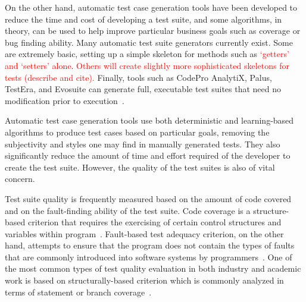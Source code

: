On the other hand, automatic test case generation tools have been developed to reduce the time and cost of developing a test suite, and some algorithms, in theory, can be used to help improve particular business goals such as coverage or bug finding ability.  Many automatic test suite generators currently exist.  Some are extremely basic, setting up a simple skeleton for methods such as \textcolor{red}{`getters' and `setters' alone}\cite{}.  \textcolor{red}{Others will create slightly more sophisticated skeletons for tests (describe and cite).}  Finally, tools such as CodePro AnalytiX, Palus, TestEra, and Evosuite can generate full, executable test suites that need no modification prior to execution~\cite{fraser:2011:eat:2025113.2025179, Zhang:2011:PHA:1985793.1986036, Marinov:2001:TNF:872023.872551, codepro}.  

Automatic test case generation tools use both deterministic and learning-based algorithms to produce test cases based on particular goals, removing the subjectivity and styles one may find in manually generated tests.  They also significantly reduce the amount of time and effort required of the developer to create the test suite.  However, the quality of the test suites is also of vital concern.  

Test suite quality is frequently measured based on the amount of code covered and on the fault-finding ability of the test suite.  Code coverage is a structure-based criterion that requires the exercising of certain control structures and variables within program~\cite{kapfhammer-testing-handbook}. Fault-based test adequacy criterion, on the other hand, attempts to ensure that the program does not contain the types of faults that are commonly introduced into software systems by programmers~\cite{demillo1978hints, zhu1997software}.  One of the most common types of test quality evaluation in both industry and academic work is based on structurally-based criterion which is commonly analyzed in terms of statement or branch coverage~\cite{weyuker1988evaluation}.

